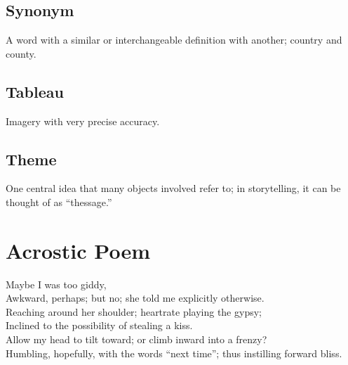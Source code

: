 \documentclass{article}
\begin{document}
\begin{addmargin}[0.5in]{0in}
    \subsection*{Synonym}
        A word with a similar or interchangeable definition with another; country and county.
    \subsection*{Tableau}
        Imagery with very precise accuracy.
    \subsection*{{\color{red}The{\color{blue}me}}}
        One central idea that many objects involved refer to; in storytelling, it can be thought of as
        ``{\color{red}the}ssage.''
\end{addmargin}

\section{Acrostic Poem}
\begin{addmargin}[0.8in]{0.8in}
    Maybe I was too giddy, \\
    Awkward, perhaps; but no; she told me explicitly otherwise. \\
    Reaching around her shoulder; heartrate playing the gypsy; \\
    Inclined to the possibility of stealing a kiss. \\
    Allow my head to tilt toward; or climb inward into a frenzy? \\
    Humbling, hopefully, with the words ``next time''; thus instilling forward bliss. \\
\end{addmargin}
\end{document}
